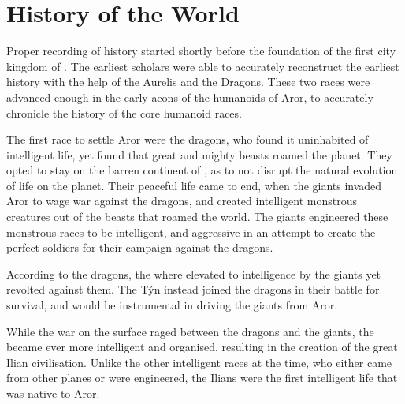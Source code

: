 \section{History of the World}
\label{sec:History}

Proper recording of history started shortly before the foundation of the
first city kingdom of . The earliest scholars
were able to accurately reconstruct the earliest history with the help of
the Aurelis and the Dragons. These two races were advanced enough in the
early aeons of the humanoids of Aror, to accurately chronicle the history
of the core humanoid races.

The first race to settle Aror were the dragons, who found it uninhabited
of intelligent life, yet found that great and mighty beasts roamed the
planet. They opted to stay on the barren continent of ,
as to not disrupt the natural evolution of life on the planet. Their peaceful
life came to end, when the giants invaded Aror to wage war against the dragons,
and created intelligent monstrous creatures out of the beasts that roamed the
world. The giants engineered these monstrous races to be intelligent, and
aggressive in an attempt to create the perfect soldiers for their campaign
against the dragons.

According to the dragons, the  where elevated to
intelligence by the giants yet revolted against them. The Týn instead joined
the dragons in their battle for survival, and would be instrumental in
driving the giants from Aror.

While the war on the surface raged between the dragons and the giants,
the  became ever more intelligent and organised, resulting
in the creation of the great Ilian civilisation. Unlike the other intelligent
races at the time, who either came from other planes or were engineered, the
Ilians were the first intelligent life that was native to Aror.


